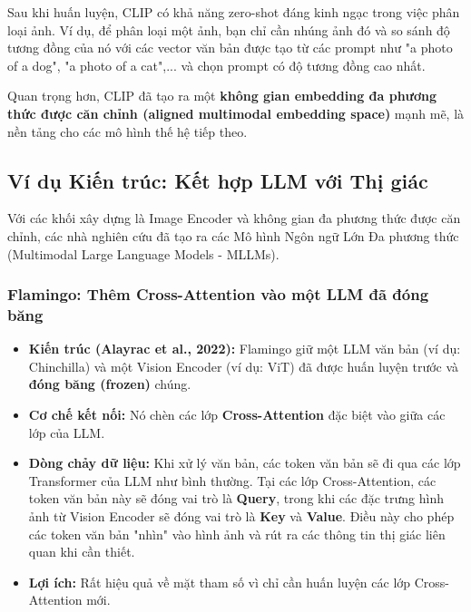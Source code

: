 Sau khi huấn luyện, CLIP có khả năng zero-shot đáng kinh ngạc trong việc phân loại ảnh. Ví dụ, để phân loại một ảnh, bạn chỉ cần nhúng ảnh đó và so sánh độ tương đồng của nó với các vector văn bản được tạo từ các prompt như "a photo of a dog", "a photo of a cat",... và chọn prompt có độ tương đồng cao nhất.

Quan trọng hơn, CLIP đã tạo ra một \textbf{không gian embedding đa phương thức được căn chỉnh (aligned multimodal embedding space)} mạnh mẽ, là nền tảng cho các mô hình thế hệ tiếp theo.

\subsection{Ví dụ Kiến trúc: Kết hợp LLM với Thị giác}
\label{ssec:multimodal_architectures_examples}
Với các khối xây dựng là Image Encoder và không gian đa phương thức được căn chỉnh, các nhà nghiên cứu đã tạo ra các Mô hình Ngôn ngữ Lớn Đa phương thức (Multimodal Large Language Models - MLLMs).

\subsubsection{Flamingo: Thêm Cross-Attention vào một LLM đã đóng băng}
\begin{itemize}
    \item \textbf{Kiến trúc (Alayrac et al., 2022):} Flamingo giữ một LLM văn bản (ví dụ: Chinchilla) và một Vision Encoder (ví dụ: ViT) đã được huấn luyện trước và \textbf{đóng băng (frozen)} chúng.
    \item \textbf{Cơ chế kết nối:} Nó chèn các lớp \textbf{Cross-Attention} đặc biệt vào giữa các lớp của LLM.
    \item \textbf{Dòng chảy dữ liệu:} Khi xử lý văn bản, các token văn bản sẽ đi qua các lớp Transformer của LLM như bình thường. Tại các lớp Cross-Attention, các token văn bản này sẽ đóng vai trò là \textbf{Query}, trong khi các đặc trưng hình ảnh từ Vision Encoder sẽ đóng vai trò là \textbf{Key} và \textbf{Value}. Điều này cho phép các token văn bản "nhìn" vào hình ảnh và rút ra các thông tin thị giác liên quan khi cần thiết.
    \item \textbf{Lợi ích:} Rất hiệu quả về mặt tham số vì chỉ cần huấn luyện các lớp Cross-Attention mới.
\end{itemize}

